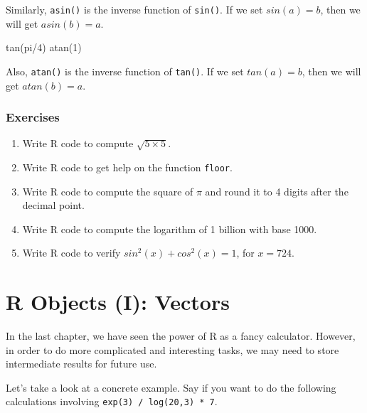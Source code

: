 \documentclass[
]{book}
\newenvironment{Shaded}{\begin{snugshade}}{\end{snugshade}}
\newcommand{\DecValTok}[1]{\textcolor[rgb]{0.00,0.00,0.81}{#1}}
\newcommand{\FunctionTok}[1]{\textcolor[rgb]{0.00,0.00,0.00}{#1}}
\newcommand{\NormalTok}[1]{#1}
\newcommand{\SpecialCharTok}[1]{\textcolor[rgb]{0.00,0.00,0.00}{#1}}
\begin{document}
Similarly, \texttt{asin()} is the inverse function of \texttt{sin()}. If we set \(sin(a) = b\), then we will get \(asin(b) = a\).

\begin{Shaded}
\begin{Highlighting}[]
\FunctionTok{tan}\NormalTok{(pi}\SpecialCharTok{/}\DecValTok{4}\NormalTok{)}
\FunctionTok{atan}\NormalTok{(}\DecValTok{1}\NormalTok{)}
\end{Highlighting}
\end{Shaded}

Also, \texttt{atan()} is the inverse function of \texttt{tan()}. If we set \(tan(a) = b\), then we will get \(atan(b) = a\).

\hypertarget{exercises-1}{%
\subsection{Exercises}\label{exercises-1}}

\begin{enumerate}
\def\labelenumi{\arabic{enumi}.}
\item
  Write R code to compute \(\sqrt{5 \times 5}\).
\item
  Write R code to get help on the function \texttt{floor}.
\item
  Write R code to compute the square of \(\pi\) and round it to 4 digits after the decimal point.
\item
  Write R code to compute the logarithm of 1 billion with base 1000.
\item
  Write R code to verify \(sin^2(x) + cos^2(x) = 1\), for \(x = 724\).
\end{enumerate}

\hypertarget{r-objects}{%
\chapter{R Objects (I): Vectors}\label{r-objects}}

In the last chapter, we have seen the power of R as a fancy calculator. However, in order to do more complicated and interesting tasks, we may need to store intermediate results for future use.

Let's take a look at a concrete example. Say if you want to do the following calculations involving \texttt{exp(3)\ /\ log(20,3)\ *\ 7}.
\end{document}
